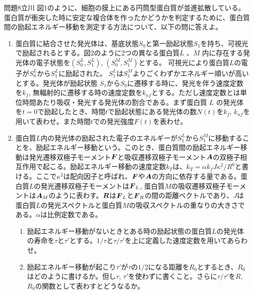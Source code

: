\documentclass[fleqn]{jbook}
\begin{document}
\def\b#1{\hbox{\boldmath$#1$}}
\def\eV{\mathrm{eV}}
\begin{question}{問題8}{立川}
図1のように、細胞の膜上にある円筒型蛋白質が並進拡散している。
蛋白質が衝突した時に安定な複合体を作ったかどうかを判定するために、蛋白質間の励起エネルギー移動を測定する方法について、以下の問に答えよ。
\begin{center}

\end{center}
\begin{enumerate}
\item 蛋白質に結合させた発光体は、基底状態$S_0$と第一励起状態$S_1$を持ち、可視光で励起されるとする。図2のように2つの異なる蛋白質$L$ 、$M$ 内に存在する発光体の電子状態を$(S_0^L,S_1^L)$, $(S_0^M,S_1^M)$とする。
可視光により蛋白質$L$の電子が$S_0^L$から$S_1^L$に励起された。
$S_1^L$は$S_1^M$よりごくわずかエネルギー順いが高いとする。発光体が励起状態
$S_1$から$S_0$に遷移する時に、発光を伴う速度定数を$k_f$, 無輻射的に遷移する時の速度定数を$k_{nf}$とする。ただし速度定数とは単位時間あたり吸収・発光する発光体の割合である。まず蛋白質 $L$ の発光体を$t=0$で励起したとき、時間$t$で励起状態にある発光体の数$N(t)$を$k_f$, $k_{nf}$を用いて表わせ。また時間$t$での発光強度$F(t)$を表わせ。
\begin{center}\end{center}
\item 蛋白質$L$内の発光体の励起された電子のエネルギーが$S_1^L$から$S_1^M$に移動することを、励起エネルギー移動という。このとき、蛋白質間の励起エネルギー移動は発光遷移双極子モーメント$\b F$と吸収遷移双極子モーメント$\b A$の双極子相互作用で起こる。励起エネルギー移動の速度定数$k_T$は、$k_T=\alpha k_f J \kappa^2 /R^6$と書ける。ここで$\kappa^2$は配向因子と呼ばれ、$\b F$や$\b A$の方向に依存する量である。蛋白質$L$の発光遷移双極子モーメントは$\b F_L$, 蛋白質$M$の吸収遷移双極子モーメントは$\b A_M$のように表わす。$\b R$は$\b F_L$と$\b F_R$の間の距離ベクトルであり、$J$は蛋白質$L$の発光スペクトルと蛋白質$M$の吸収スペクトルの重なりの大きさである。$\alpha$は比例定数である。
\begin{enumerate}
\item 励起エネルギー移動がないときとある時の励起状態の蛋白質$L$の発光体の寿命を$\tau$と$\tau'$とする。$1/\tau$と$\tau/\tau'$を上に定義した速度定数を用いてあらわせ。
\item 励起エネルギー移動が起こり$\tau'$が$\tau$の$1/2$になる距離を$R_0$とするとき、$R_0$はどのように書けるか。但し$\tau$, $\tau'$を使わずに書くこと。さらに$\tau/\tau'$を$R$, $R_0$の関数として表わすとどうなるか。

\end{enumerate}
\end{enumerate}
\end{question}
\end{document}
